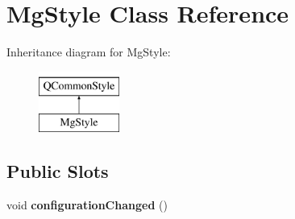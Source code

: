 \hypertarget{class_mg_style}{}\section{Mg\+Style Class Reference}
\label{class_mg_style}
Inheritance diagram for Mg\+Style\+:\begin{figure}[H]
\begin{center}
\leavevmode
\includegraphics[height=2.000000cm]{class_mg_style}
\end{center}
\end{figure}
\subsection*{Public Slots}
\begin{DoxyCompactItemize}
\item 
\mbox{\label{class_mg_style_a43e6f8ff4f33405d947f0aaaed3da841}} 
void {\bfseries configuration\+Changed} ()
\end{DoxyCompactItemize}
